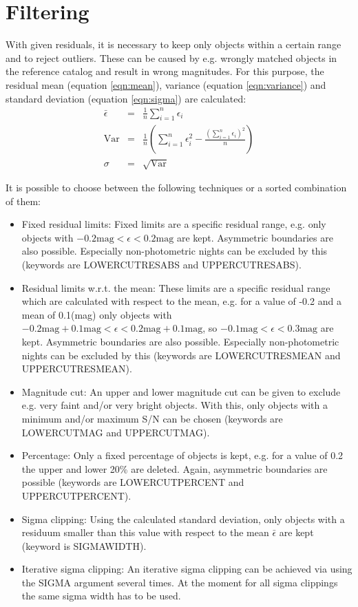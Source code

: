 \section{Filtering}
\label{sec:Filtering}
With given residuals, it is necessary to keep only objects within a certain range and to reject outliers. These can be caused by e.g. wrongly matched objects in the reference catalog and result in wrong magnitudes. For this purpose, the residual mean (equation \ref{eqn:mean}), variance (equation \ref{eqn:variance}) and standard deviation (equation \ref{eqn:sigma}) are calculated:
\begin{eqnarray}
\bar \epsilon & = & \frac{1}{n} \sum_{i=1}^{n} \epsilon_{i}\label{eqn:mean}\\
\mathrm{Var} & = & \frac{1}{n} \left(\sum_{i=1}^{n} \epsilon_{i}^{2} - \frac{\left( \sum_{i=1}^{n} \epsilon_{i} \right)^{2}}{n} \right) \label{eqn:variance}\\
\sigma & = & \sqrt{\mathrm{Var}}\label{eqn:sigma}
\end{eqnarray}

It is possible to choose between the following techniques or a sorted combination of them:

\begin{itemize}
\item Fixed residual limits: Fixed limits are a specific residual range, e.g. only objects with $-0.2\text{mag} < \epsilon < 0.2\text{mag}$ are kept. Asymmetric boundaries are also possible. Especially non-photometric nights can be excluded by this (keywords are LOWERCUTRESABS and UPPERCUTRESABS).
\item Residual limits w.r.t. the mean: These limits are a specific residual range which are calculated with respect to the mean, e.g. for a value of -0.2 and a mean of 0.1(mag) only objects with $-0.2\text{mag}+0.1\text{mag} < \epsilon < 0.2\text{mag}+0.1\text{mag}$, so $-0.1\text{mag} < \epsilon < 0.3\text{mag}$ are kept. Asymmetric boundaries are also possible. Especially non-photometric nights can be excluded by this (keywords are LOWERCUTRESMEAN and UPPERCUTRESMEAN).
\item Magnitude cut: An upper and lower magnitude cut can be given to exclude e.g. very faint and/or very bright objects. With this, only objects with a minimum and/or maximum S/N can be chosen (keywords are LOWERCUTMAG and UPPERCUTMAG).
\item Percentage: Only a fixed percentage of objects is kept, e.g. for a value of 0.2 the upper and lower 20\% are deleted. Again, asymmetric boundaries are possible (keywords are LOWERCUTPERCENT and UPPERCUTPERCENT).
\item Sigma clipping: Using the calculated standard deviation, only objects with a residuum smaller than this value with respect to the mean $\bar \epsilon$ are kept (keyword is SIGMAWIDTH).
\item Iterative sigma clipping: An iterative sigma clipping can be achieved via using the SIGMA argument several times. At the moment for all sigma clippings the same sigma width has to be used.
\end{itemize}

